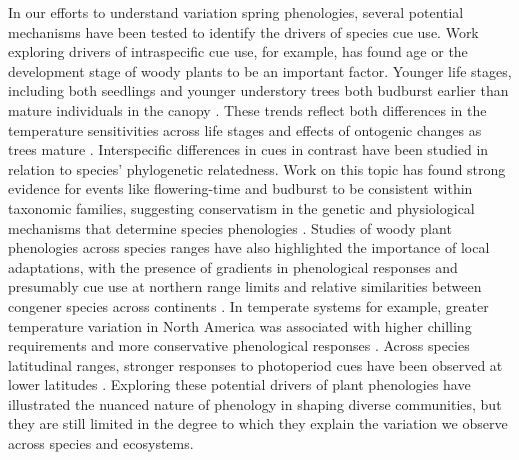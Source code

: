 \documentclass{article}\usepackage[]{graphicx}\usepackage[]{color}
\begin{document}
In our efforts to understand variation spring phenologies, several potential mechanisms have been tested to identify the drivers of species cue use. Work exploring drivers of intraspecific cue use, for example, has found age or the development stage of woody plants to be an important factor. Younger life stages, including both seedlings and younger understory trees both budburst earlier than mature individuals in the canopy \citep{Vitasse2013,Seiwa1991}. These trends reflect both differences in the temperature sensitivities across life stages and effects of ontogenic changes as trees mature \citep{Vitasse2013,Seiwa1991}. Interspecific differences in cues in contrast have been studied in relation to species' phylogenetic relatedness. Work on this topic has found strong evidence for events like flowering-time and budburst to be consistent within taxonomic families, suggesting conservatism in the genetic and physiological mechanisms that determine species phenologies \citep{Kochmer1986,Davies2013,Gougherty2018}. Studies of woody plant phenologies across species ranges have also highlighted the importance of local adaptations, with the presence of gradients in phenological responses and presumably cue use at northern range limits and relative similarities between congener species across continents \citep{Lechowicz1984,Chuine2001,Chuine2010}. %
 In temperate systems for example, greater temperature variation in North America was associated with higher chilling requirements and more conservative phenological responses \citep{Zohner2017}.  Across species latitudinal ranges, stronger responses to photoperiod cues have been observed at lower latitudes \citep{Zohner2016}. Exploring these potential drivers of plant phenologies have illustrated the nuanced nature of phenology in shaping diverse communities, but they are still limited in the degree to which they explain the variation we observe across species and ecosystems.
\end{document}
